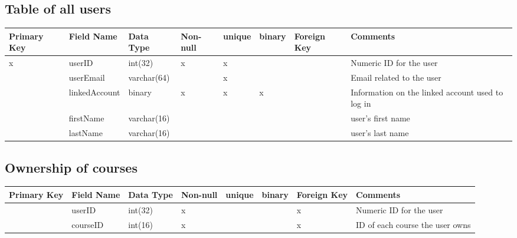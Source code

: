\documentclass{article}
\begin{document}
\subsection{Table of all users}
\begin{tabular}{|m{1cm} | m{2.5cm} | m{1.5cm}| m{1cm} | m{1cm}| m{1cm} | m{1cm}| m{3.5cm}| }
  \hline
  Primary Key & Field Name & Data Type & Non-null & unique & binary & Foreign Key & Comments\\ 
  \hline
  x & userID & int(32) & x & x & & & Numeric ID for the user\\
  \hline
   & userEmail & varchar(64) & & x & & & Email related to the user\\
  \hline
   & linkedAccount & binary & x & x & x & & Information on the linked account used to log in\\
  \hline
   & firstName & varchar(16) & & & & & user's first name\\
  \hline
   & lastName & varchar(16) & & & & & user's last name\\
  \hline
\end{tabular}

\subsection{Ownership of courses}
\begin{tabular}{|m{1cm} | m{2cm} | m{1.5cm}| m{1cm} | m{1cm}| m{1cm} | m{1cm}| m{4cm}| }
  \hline
  Primary Key & Field Name & Data Type & Non-null & unique & binary & Foreign Key & Comments\\ 
  \hline
   & userID & int(32) & x & & & x & Numeric ID for the user\\
  \hline
   & courseID & int(16) & x & & & x & ID of each course the user owns\\
  \hline
\end{tabular}
\end{document}
